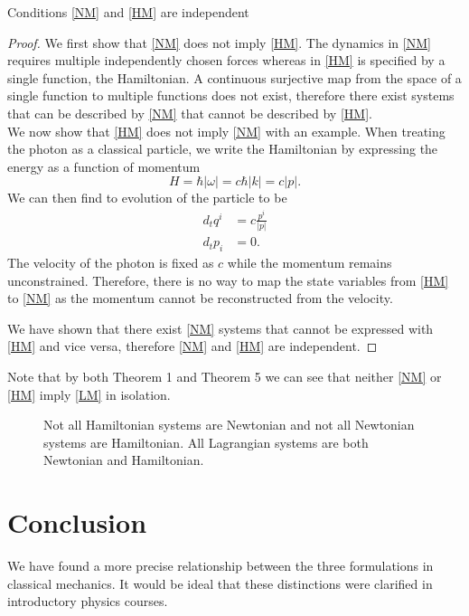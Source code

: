 \documentclass{techbrief}
\begin{document}
	\begin{thrm}
		Conditions \ref{NM} and \ref{HM} are independent
	\end{thrm}
	\begin{proof}
	We first show that \ref{NM} does not imply \ref{HM}. The dynamics in \ref{NM} requires multiple independently chosen forces whereas in \ref{HM} is specified by a single function, the Hamiltonian. A continuous surjective map from the space of a single function to multiple functions does not exist, therefore there exist systems that can be described by \ref{NM} that cannot be described by \ref{HM}. \\

	We now show that \ref{HM} does not imply \ref{NM} with an example. When treating the photon as a classical particle, we write the Hamiltonian by expressing the energy as a function of momentum
	\begin{equation}
		H=\hbar | \omega| = c \hbar |k| = c |p|.
	\end{equation}
	We can then find to evolution of the particle to be
	\begin{equation}
		\begin{aligned}
			d_t q^i &= c \frac{p^i}{|p|} \\
			d_t p_i &= 0.
		\end{aligned}
	\end{equation} 
	The velocity of the photon is fixed as $c$ while the momentum remains unconstrained. Therefore, there is no way to map the state variables from \ref{HM} to \ref{NM} as the momentum cannot be reconstructed from the velocity.
	
	We have shown that there exist \ref{NM} systems that cannot be expressed with \ref{HM} and vice versa, therefore \ref{NM} and \ref{HM} are independent.
	\end{proof}
	
	Note that by both Theorem 1 and Theorem 5 we can see that neither \ref{NM} or \ref{HM} imply \ref{LM} in isolation.
	
	\begin{figure}[h]
		\centering
		\caption {Not all Hamiltonian systems are Newtonian and not all Newtonian systems are Hamiltonian. All Lagrangian systems are both Newtonian and Hamiltonian.}\label{rp-cm-fig-vennDiagramEarly}
	\end{figure}
	\section{Conclusion}
		We have found a more precise relationship between the three formulations in classical mechanics. It would be ideal that these distinctions were clarified in introductory physics courses.
	
	
\end{document}
